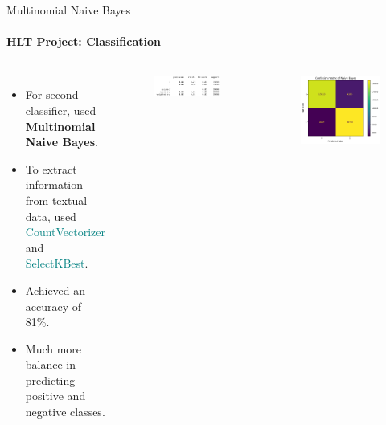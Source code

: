 \documentclass{beamer}
\theoremstyle{definition}
\theoremstyle{plain}
\begin{document}
\begin{frame}{Multinomial Naive Bayes}
\framesubtitle{HLT Project: Classification}

\begin{columns}
    \vspace{-1cm}
    {\small 
        \begin{itemize}
            \item For second classifier, used \textbf{Multinomial Naive Bayes}.
            \item To extract information from textual data, used \textcolor{teal}{CountVectorizer} and \textcolor{teal}{SelectKBest}.
            \item Achieved an accuracy of 81\%.
            \item Much more balance in predicting positive and negative classes.
        \end{itemize}
    }

    \vspace{-0.3cm}
    \begin{figure}
        \centering
        \includegraphics[scale=0.4]{Figures/naive_bayes_acc.png}
    \end{figure}
    \vspace{-0.3cm}
    \begin{figure}
        \centering
        \includegraphics[scale=0.35]{Figures/NaiveBayes.png}
    \end{figure}
\end{columns}
\end{frame}
\end{document}
